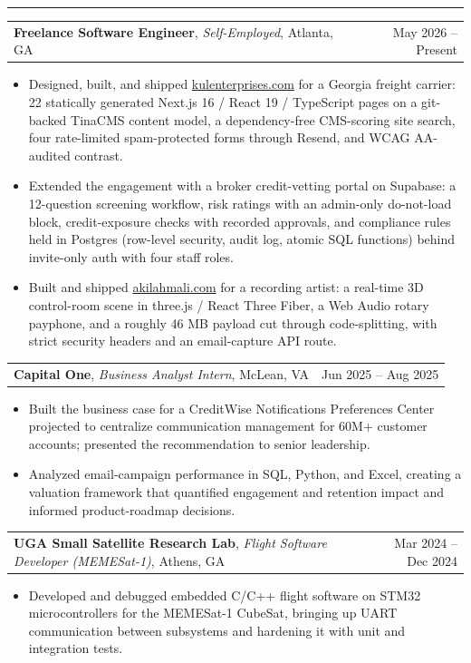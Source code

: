 \documentclass[letterpaper,10pt]{article}
\makeatletter
\newcommand{\IfEmpty}[3]{\if\relax\detokenize{#1}\relax#2\else#3\fi}
\newcommand{\sectiontitle}[1]{\vspace{4pt}{\textbf{\large #1}}\par\vspace{-6pt}\rule{\textwidth}{0.4pt}\par\vspace{1pt}}
\newcommand{\experienceheading}[4]{\begin{tabularx}{\textwidth}{@{}X r@{}}\textbf{#1}\IfEmpty{#2}{}{, \textit{#2}}\IfEmpty{#3}{}{, #3} & #4 \\ \end{tabularx}\par\vspace{1pt}}
\makeatother
\begin{document}
\sectiontitle{EXPERIENCE}
\experienceheading{Freelance Software Engineer}{Self-Employed}{Atlanta, GA}{May 2026 -- Present}
\begin{itemize}
\item Designed, built, and shipped \href{https://www.kulenterprises.com}{kulenterprises.com} for a Georgia freight carrier: 22 statically generated Next.js 16 / React 19 / TypeScript pages on a git-backed TinaCMS content model, a dependency-free CMS-scoring site search, four rate-limited spam-protected forms through Resend, and WCAG AA-audited contrast.
\item Extended the engagement with a broker credit-vetting portal on Supabase: a 12-question screening workflow, risk ratings with an admin-only do-not-load block, credit-exposure checks with recorded approvals, and compliance rules held in Postgres (row-level security, audit log, atomic SQL functions) behind invite-only auth with four staff roles.
\item Built and shipped \href{https://www.akilahmali.com}{akilahmali.com} for a recording artist: a real-time 3D control-room scene in three.js / React Three Fiber, a Web Audio rotary payphone, and a roughly 46 MB payload cut through code-splitting, with strict security headers and an email-capture API route.
\end{itemize}
\experienceheading{Capital One}{Business Analyst Intern}{McLean, VA}{Jun 2025 -- Aug 2025}
\begin{itemize}
\item Built the business case for a CreditWise Notifications Preferences Center projected to centralize communication management for 60M+ customer accounts; presented the recommendation to senior leadership.
\item Analyzed email-campaign performance in SQL, Python, and Excel, creating a valuation framework that quantified engagement and retention impact and informed product-roadmap decisions.
\end{itemize}
\experienceheading{UGA Small Satellite Research Lab}{Flight Software Developer (MEMESat-1)}{Athens, GA}{Mar 2024 -- Dec 2024}
\begin{itemize}
\item Developed and debugged embedded C/C++ flight software on STM32 microcontrollers for the MEMESat-1 CubeSat, bringing up UART communication between subsystems and hardening it with unit and integration tests.
\end{itemize}
\end{document}
